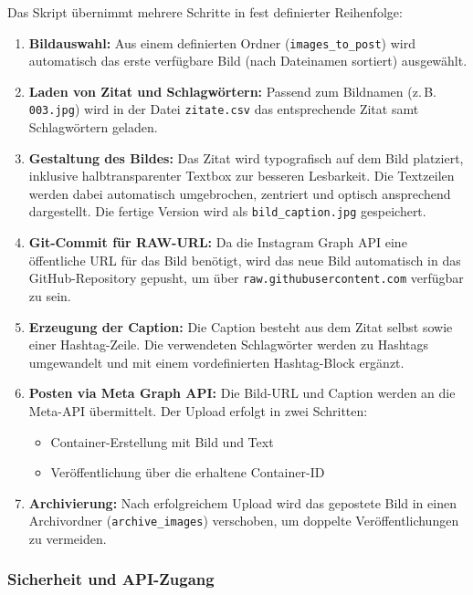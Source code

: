 \documentclass[a4paper,12pt]{article}
\begin{document}
Das Skript übernimmt mehrere Schritte in fest definierter Reihenfolge:

\begin{enumerate}
    \item \textbf{Bildauswahl:} Aus einem definierten Ordner (\texttt{images\_to\_post}) wird automatisch das erste verfügbare Bild (nach Dateinamen sortiert) ausgewählt.

    \item \textbf{Laden von Zitat und Schlagwörtern:} Passend zum Bildnamen (z.\,B. \texttt{003.jpg}) wird in der Datei \texttt{zitate.csv} das entsprechende Zitat samt Schlagwörtern geladen.

    \item \textbf{Gestaltung des Bildes:} Das Zitat wird typografisch auf dem Bild platziert, inklusive halbtransparenter Textbox zur besseren Lesbarkeit. Die Textzeilen werden dabei automatisch umgebrochen, zentriert und optisch ansprechend dargestellt. Die fertige Version wird als \texttt{bild\_caption.jpg} gespeichert.

    \item \textbf{Git-Commit für RAW-URL:} Da die Instagram Graph API eine öffentliche URL für das Bild benötigt, wird das neue Bild automatisch in das GitHub-Repository gepusht, um über \texttt{raw.githubusercontent.com} verfügbar zu sein.
\clearpage
    \item \textbf{Erzeugung der Caption:} Die Caption besteht aus dem Zitat selbst sowie einer Hashtag-Zeile. Die verwendeten Schlagwörter werden zu Hashtags umgewandelt und mit einem vordefinierten Hashtag-Block ergänzt.

    \item \textbf{Posten via Meta Graph API:} Die Bild-URL und Caption werden an die Meta-API übermittelt. Der Upload erfolgt in zwei Schritten:
    \begin{itemize}
        \item Container-Erstellung mit Bild und Text
        \item Veröffentlichung über die erhaltene Container-ID
    \end{itemize}

    \item \textbf{Archivierung:} Nach erfolgreichem Upload wird das gepostete Bild in einen Archivordner (\texttt{archive\_images}) verschoben, um doppelte Veröffentlichungen zu vermeiden.
\end{enumerate}

\subsubsection*{Sicherheit und API-Zugang}
\end{document}
